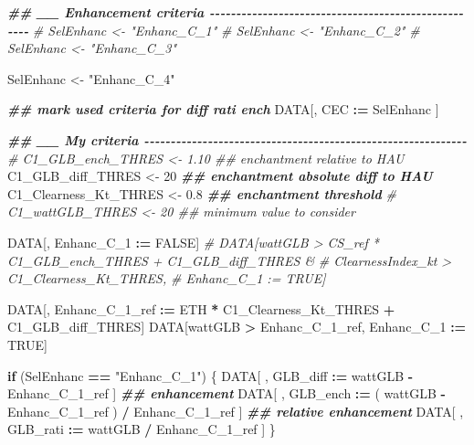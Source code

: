 \documentclass[
  10pt,
  a4paper,oneside]{article}
\newenvironment{Shaded}{\begin{snugshade}}{\end{snugshade}}
\newcommand{\CommentTok}[1]{\textcolor[rgb]{0.56,0.35,0.01}{\textit{#1}}}
\newcommand{\ConstantTok}[1]{\textcolor[rgb]{0.56,0.35,0.01}{#1}}
\newcommand{\ControlFlowTok}[1]{\textcolor[rgb]{0.13,0.29,0.53}{\textbf{#1}}}
\newcommand{\DecValTok}[1]{\textcolor[rgb]{0.00,0.00,0.81}{#1}}
\newcommand{\DocumentationTok}[1]{\textcolor[rgb]{0.56,0.35,0.01}{\textbf{\textit{#1}}}}
\newcommand{\FloatTok}[1]{\textcolor[rgb]{0.00,0.00,0.81}{#1}}
\newcommand{\NormalTok}[1]{#1}
\newcommand{\OtherTok}[1]{\textcolor[rgb]{0.56,0.35,0.01}{#1}}
\newcommand{\SpecialCharTok}[1]{\textcolor[rgb]{0.81,0.36,0.00}{\textbf{#1}}}
\newcommand{\StringTok}[1]{\textcolor[rgb]{0.31,0.60,0.02}{#1}}
\begin{document}
\begin{Shaded}
\begin{Highlighting}[]
\DocumentationTok{\#\# \_\_ Enhancement criteria  {-}{-}{-}{-}{-}{-}{-}{-}{-}{-}{-}{-}{-}{-}{-}{-}{-}{-}{-}{-}{-}{-}{-}{-}{-}{-}{-}{-}{-}{-}{-}{-}{-}{-}{-}{-}{-}{-}{-}{-}{-}{-}{-}{-}{-}{-}{-}{-}{-}{-}{-}{-}}
\CommentTok{\# SelEnhanc \textless{}{-} "Enhanc\_C\_1"}
\CommentTok{\# SelEnhanc \textless{}{-} "Enhanc\_C\_2"}
\CommentTok{\# SelEnhanc \textless{}{-} "Enhanc\_C\_3"}

\NormalTok{SelEnhanc }\OtherTok{\textless{}{-}} \StringTok{"Enhanc\_C\_4"}


\DocumentationTok{\#\# mark used criteria for diff rati ench}
\NormalTok{DATA[, CEC }\SpecialCharTok{:=}\NormalTok{ SelEnhanc ]}



\DocumentationTok{\#\# \_\_ My criteria  {-}{-}{-}{-}{-}{-}{-}{-}{-}{-}{-}{-}{-}{-}{-}{-}{-}{-}{-}{-}{-}{-}{-}{-}{-}{-}{-}{-}{-}{-}{-}{-}{-}{-}{-}{-}{-}{-}{-}{-}{-}{-}{-}{-}{-}{-}{-}{-}{-}{-}{-}{-}{-}{-}{-}{-}{-}{-}{-}{-}{-}}
\CommentTok{\# C1\_GLB\_ench\_THRES     \textless{}{-}  1.10 \#\# enchantment relative to HAU}
\NormalTok{C1\_GLB\_diff\_THRES     }\OtherTok{\textless{}{-}} \DecValTok{20}    \DocumentationTok{\#\# enchantment absolute diff to HAU}
\NormalTok{C1\_Clearness\_Kt\_THRES }\OtherTok{\textless{}{-}}  \FloatTok{0.8}  \DocumentationTok{\#\# enchantment threshold}
\CommentTok{\# C1\_wattGLB\_THRES      \textless{}{-} 20    \#\# minimum value to consider}

\NormalTok{DATA[, Enhanc\_C\_1 }\SpecialCharTok{:=} \ConstantTok{FALSE}\NormalTok{]}
\CommentTok{\# DATA[wattGLB           \textgreater{} CS\_ref * C1\_GLB\_ench\_THRES + C1\_GLB\_diff\_THRES \&}
\CommentTok{\#      ClearnessIndex\_kt \textgreater{} C1\_Clearness\_Kt\_THRES,}
\CommentTok{\#      Enhanc\_C\_1 := TRUE]}

\NormalTok{DATA[, Enhanc\_C\_1\_ref }\SpecialCharTok{:=}\NormalTok{ ETH }\SpecialCharTok{*}\NormalTok{ C1\_Clearness\_Kt\_THRES }\SpecialCharTok{+}\NormalTok{ C1\_GLB\_diff\_THRES]}
\NormalTok{DATA[wattGLB }\SpecialCharTok{\textgreater{}}\NormalTok{ Enhanc\_C\_1\_ref,}
\NormalTok{     Enhanc\_C\_1 }\SpecialCharTok{:=} \ConstantTok{TRUE}\NormalTok{]}

\ControlFlowTok{if}\NormalTok{ (SelEnhanc }\SpecialCharTok{==} \StringTok{"Enhanc\_C\_1"}\NormalTok{) \{}
\NormalTok{    DATA[ , GLB\_diff }\SpecialCharTok{:=}\NormalTok{   wattGLB }\SpecialCharTok{{-}}\NormalTok{ Enhanc\_C\_1\_ref                    ] }\DocumentationTok{\#\# enhancement}
\NormalTok{    DATA[ , GLB\_ench }\SpecialCharTok{:=}\NormalTok{ ( wattGLB }\SpecialCharTok{{-}}\NormalTok{ Enhanc\_C\_1\_ref ) }\SpecialCharTok{/}\NormalTok{ Enhanc\_C\_1\_ref ] }\DocumentationTok{\#\# relative enhancement}
\NormalTok{    DATA[ , GLB\_rati }\SpecialCharTok{:=}\NormalTok{   wattGLB }\SpecialCharTok{/}\NormalTok{ Enhanc\_C\_1\_ref                    ]}
\NormalTok{\}}




\end{Highlighting}
\end{Shaded}
\end{document}
